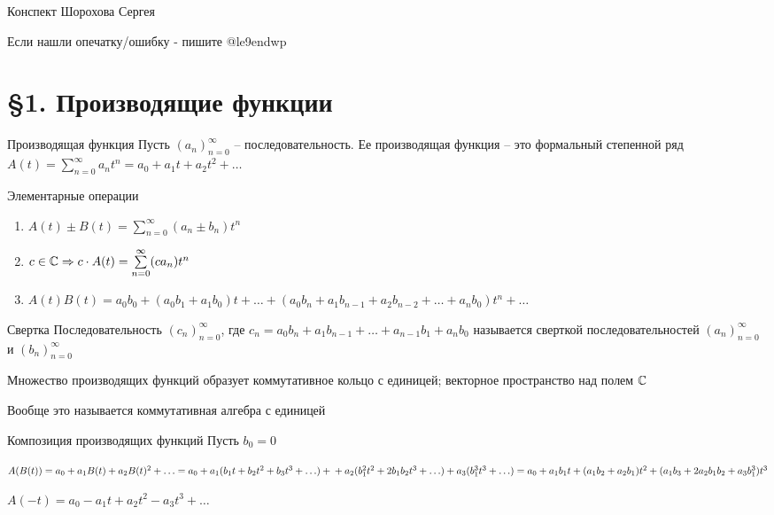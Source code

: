 \documentclass[12pt]{article}
\begin{document}
\begin{flushright}
    Конспект Шорохова Сергея

    Если нашли опечатку/ошибку - пишите @le9endwp 
\end{flushright}

\tableofcontents
\newpage

\section{\S 1. Производящие функции}

\begin{defin}{Производящая функция}
    Пусть $(a_n)_{n = 0}^\infty$ -- последовательность. Ее производящая функция -- это формальный степенной ряд $A(t) = \sum\limits_{n = 0}^\infty a_n t^n = a_0 + a_1t + a_2t^2 + \ldots$
\end{defin}

\begin{nota}{Элементарные операции}
    \begin{enumerate}
        \item $A(t) \pm B(t) = \sum\limits_{n = 0}^\infty (a_n \pm b_n) t^n$
        \item $c \in \mathbb C \Rightarrow c \cdot A(t) = \sum\limits_{n = 0}^\infty (ca_n)t^n$
        \item $A(t)B(t) = a_0b_0 + (a_0b_1 + a_1b_0)t + \ldots + (a_0b_n + a_1b_{n - 1} + a_2b_{n - 2} + \ldots + a_nb_0)t^n + \ldots$
    \end{enumerate}
\end{nota}

\begin{defin}{Свертка}
    Последовательность $(c_n)_{n = 0}^\infty$, где $c_n = a_0b_n + a_1b_{n - 1} + \ldots + a_{n - 1}b_1 + a_nb_0$ называется сверткой последовательностей $(a_n)_{n = 0}^\infty$ и $(b_n)_{n = 0}^\infty$
\end{defin}

\begin{Remark}{}
    Множество производящих функций образует коммутативное кольцо с единицей; векторное пространство над полем $\mathbb C$

    Вообще это называется коммутативная алгебра с единицей
\end{Remark}

\begin{defin}{Композиция производящих функций}
    Пусть $b_0 = 0$

    $A(B(t)) = a_0 + a_1B(t) + a_2B(t)^2 + \ldots = a_0 + a_1(b_1t + b_2t^2 + b_3t^3 + \ldots) + \\
    + a_2(b_1^2t^2 + 2b_1b_2t^3 + \ldots) + a_3(b_1^3t^3 + \ldots) = a_0 + a_1b_1t + (a_1b_2 + a_2b_1)t^2 + (a_1b_3 + 2a_2b_1b_2 + a_3b_1^3)t^3$

    \begin{Example}{}
        $A(-t) = a_0 - a_1t + a_2t^2 - a_3t^3 + \ldots$
    \end{Example}
\end{defin}
\end{document}
